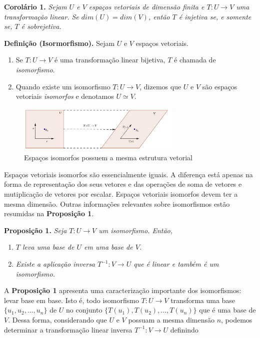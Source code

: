 \vspace{1cm}
\noindent\textbf{Corolário 1.} \textit{Sejam $U$  e $V$ espaços vetoriais de dimensão finita e    $T: U \rightarrow V$ uma transformação linear. Se $dim(U)=dim(V)$, então  $T$ é injetiva se, e somente se, $T$ é sobrejetiva.}

\vspace{1cm}
\noindent\textbf{Definição (Isormorfismo).} Sejam $U$  e $V$ espaços vetoriais.
\begin{enumerate}%
\item Se $T: U \rightarrow V$  é uma transformação linear bijetiva, $T$ é chamada de \textit{isomorfismo}.
\item Quando existe um isomorfismo  $T: U \rightarrow V$, dizemos que $U$ e $V$ são espaços vetoriais \textit{isomorfos} e denotamos $U \simeq V$.
\end{enumerate}

\begin{figure}[h]
\center
\includegraphics[width=0.70\textwidth]{chapters/transformacoes_lineares/img/isomorfismo}
\caption{\footnotesize{Espaços isomorfos possuem a mesma estrutura vetorial }}
\label{fig:exp}
\end{figure}

Espaços vetoriais isomorfos são essencialmente  iguais. A diferença está apenas na forma de representação dos seus vetores e das operações de soma de vetores e mutiplicação de vetores por escalar. Espaços vetoriais isomorfos devem ter a mesma dimensão.  Outras informações relevantes sobre isomorfismos estão resumidas na \textbf{Proposição 1}.

\vspace{1cm}
\noindent\textbf{Proposição 1.} \textit{Seja $T: U \rightarrow V$ um isomorfismo. Então, }
\begin{enumerate}%
\item \textit{ $T$ leva uma base de $U$ em  uma base de $V$.}
\item \textit{Existe a  aplicação inversa $T^{-1}: V \rightarrow U$ que é linear e também é um isomorfismo.}
\end{enumerate}

A \textbf{Proposição 1} apresenta uma caracterização importante dos isomorfismos: levar  base  em base. Isto é, todo isomorfismo  $T: U \rightarrow V$  transforma uma base $\{ u_1, u_2,...,u_n\}$ de $U$ no conjunto  $\{T( u_1), T(u_2),...,T(u_n)\}$ que é uma base de $V$. Dessa forma, considerando que $U$ e $V$ possuam a mesma dimensão $n$, podemos determinar a transformação linear inversa $T^{-1}: V \rightarrow U$ definindo

